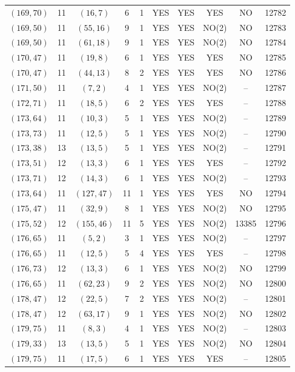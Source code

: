 \begin{longtable}{|c|c|c|c|c|c|c|c|c|c|}
$(169, 70)$ & 11 & $(16, 7)$ & 6 & 1 & YES & YES & YES & NO & 12782\\
$(169, 50)$ & 11 & $(55, 16)$ & 9 & 1 & YES & YES & NO(2) & NO & 12783\\
$(169, 50)$ & 11 & $(61, 18)$ & 9 & 1 & YES & YES & NO(2) & NO & 12784\\
$(170, 47)$ & 11 & $(19, 8)$ & 6 & 1 & YES & YES & YES & NO & 12785\\
$(170, 47)$ & 11 & $(44, 13)$ & 8 & 2 & YES & YES & YES & NO & 12786\\
$(171, 50)$ & 11 & $(7, 2)$ & 4 & 1 & YES & YES & NO(2) & -- & 12787\\
$(172, 71)$ & 11 & $(18, 5)$ & 6 & 2 & YES & YES & YES & -- & 12788\\
$(173, 64)$ & 11 & $(10, 3)$ & 5 & 1 & YES & YES & NO(2) & -- & 12789\\
$(173, 73)$ & 11 & $(12, 5)$ & 5 & 1 & YES & YES & NO(2) & -- & 12790\\
$(173, 38)$ & 13 & $(13, 5)$ & 5 & 1 & YES & YES & NO(2) & -- & 12791\\
$(173, 51)$ & 12 & $(13, 3)$ & 6 & 1 & YES & YES & YES & -- & 12792\\
$(173, 71)$ & 12 & $(14, 3)$ & 6 & 1 & YES & YES & NO(2) & -- & 12793\\
$(173, 64)$ & 11 & $(127, 47)$ & 11 & 1 & YES & YES & YES & NO & 12794\\
$(175, 47)$ & 11 & $(32, 9)$ & 8 & 1 & YES & YES & NO(2) & NO & 12795\\
$(175, 52)$ & 12 & $(155, 46)$ & 11 & 5 & YES & YES & NO(2) & 13385 & 12796\\
$(176, 65)$ & 11 & $(5, 2)$ & 3 & 1 & YES & YES & NO(2) & -- & 12797\\
$(176, 65)$ & 11 & $(12, 5)$ & 5 & 4 & YES & YES & YES & -- & 12798\\
$(176, 73)$ & 12 & $(13, 3)$ & 6 & 1 & YES & YES & NO(2) & NO & 12799\\
$(176, 65)$ & 11 & $(62, 23)$ & 9 & 2 & YES & YES & NO(2) & NO & 12800\\
$(178, 47)$ & 12 & $(22, 5)$ & 7 & 2 & YES & YES & NO(2) & -- & 12801\\
$(178, 47)$ & 12 & $(63, 17)$ & 9 & 1 & YES & YES & NO(2) & NO & 12802\\
$(179, 75)$ & 11 & $(8, 3)$ & 4 & 1 & YES & YES & NO(2) & -- & 12803\\
$(179, 33)$ & 13 & $(13, 5)$ & 5 & 1 & YES & YES & NO(2) & NO & 12804\\
$(179, 75)$ & 11 & $(17, 5)$ & 6 & 1 & YES & YES & YES & -- & 12805\\

\end{longtable}
